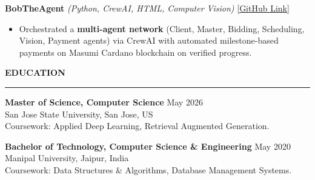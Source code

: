 \documentclass[letterpaper,10.5pt]{extarticle}
\newcommand{\resumesection}[1]{%
    \vspace{6pt}%
    \noindent\textbf{#1}\vspace{-5pt}%
    \\\noindent\rule{\textwidth}{0.5pt}%
    \vspace{1pt}%
}
\begin{document}
\vspace{2pt}

\noindent\textbf{BobTheAgent} \textit{(Python, CrewAI, HTML, Computer Vision)} \hfill \href{https://github.com/slowloris-98/BobTheAgent}{[GitHub Link]}

\begin{itemize}[leftmargin=12pt, topsep=1pt, itemsep=0pt, parsep=0pt]
    \item Orchestrated a \textbf{multi-agent network} (Client, Master, Bidding, Scheduling, Vision, Payment agents) via CrewAI with automated milestone-based payments on Masumi Cardano blockchain on verified progress.
\end{itemize}

\resumesection{EDUCATION}

\noindent\textbf{Master of Science, Computer Science} \hfill May 2026\\
San Jose State University, San Jose, US\\
Coursework: Applied Deep Learning, Retrieval Augmented Generation.

\vspace{3pt}

\noindent\textbf{Bachelor of Technology, Computer Science \& Engineering} \hfill May 2020\\
Manipal University, Jaipur, India\\
Coursework: Data Structures \& Algorithms, Database Management Systems.
\end{document}
